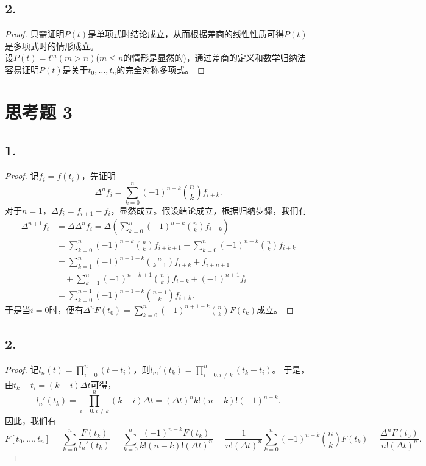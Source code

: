 \documentclass[utf8]{ctexart}
\begin{document}
\subsection*{2.}
\begin{proof}
    只需证明$P(t)$是单项式时结论成立，从而根据差商的线性性质可得$P(t)$是多项式时的情形成立。\\
    设$P(t)=t^m(m> n)$($m\leq n$的情形是显然的)，通过差商的定义和数学归纳法容易证明$P(t)$是关于$t_0,\dots,t_n$的完全对称多项式。
\end{proof}

\section*{思考题 3}
\subsection*{1.}
\begin{proof}
    记$f_i=f(t_i)$，先证明
    $$
    \Delta^nf_i = \sum_{k=0}^n(-1)^{n-k}\binom{n}{k}f_{i+k}.
    $$
    对于$n=1$，$\Delta f_i = f_{i+1} -f_i$，显然成立。假设结论成立，根据归纳步骤，我们有
$$
\begin{aligned}
\Delta^{n+1}f_i &= \Delta\Delta^nf_i = \Delta\left( \sum_{k=0}^n(-1)^{n-k}\binom{n}{k}f_{i+k}\right)\\
&= \sum_{k=0}^n(-1)^{n-k}\binom{n}{k}f_{i+k+1} - \sum_{k=0}^n(-1)^{n-k}\binom{n}{k}f_{i+k}\\
&= \sum_{k=1}^n(-1)^{n+1-k}\binom{n}{k-1}f_{i+k} + f_{i+n+1} \\
&\quad + \sum_{k=1}^n(-1)^{n-k+1}\binom{n}{k}f_{i+k} + (-1)^{n+1}f_i\\
&= \sum_{k=0}^{n+1}(-1)^{n+1-k}\binom{n+1}{k}f_{i+k}.
\end{aligned}
$$
于是当$i=0$时，便有$\Delta^{n}F(t_0) = \sum_{k=0}^{n}(-1)^{n+1-k}\binom{n}{k}F(t_k)$成立。
\end{proof}

\subsection*{2.}
\begin{proof}
    记$l_n(t)=\prod_{i=0}^n(t-t_i)$，则$l_m'(t_k) = \prod_{i=0,i\ne k}^n(t_k-t_i)$。
    于是，由$t_k-t_i = (k-i)\Delta t$可得， 
    $$
    l_n'(t_k) = \prod_{i=0,i\ne k}^n (k-i)\Delta t = (\Delta t)^nk!(n-k)!(-1)^{n-k}.
    $$
    因此，我们有
    $$
    F[t_0,\dots,t_n] = \sum_{k=0}^n\frac{F(t_k)}{l_n'(t_k)} = \sum_{k=0}^n\frac{(-1)^{n-k}F(t_k)}{k!(n-k)!(\Delta t)^n} 
    = \frac{1}{n!(\Delta t)^n}\sum_{k=0}^n(-1)^{n-k}\binom{n}{k}F(t_k) = \frac{\Delta^n F(t_0)}{n!(\Delta t)^n}.
    $$
\end{proof}
\end{document}
